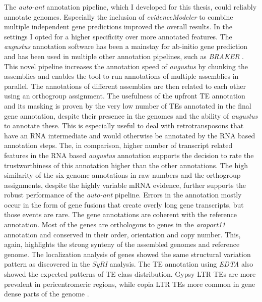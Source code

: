 The \textit{auto-ant} annotation pipeline, which I developed for this thesis, could reliably annotate genomes. Especially the inclusion of \textit{evidenceModeler} to combine multiple independent gene predictions improved the overall results. In the settings I opted for a higher specificity over more annotated features. The \textit{augustus} annotation software has been a mainstay for ab-initio gene prediction and has been used in multiple other annotation pipelines, such as \textit{BRAKER} \citep{Hoff2019-zi}. This novel pipeline increases the annotation speed of \textit{augustus} by chunking the assemblies and enables the tool to run annotations of multiple assemblies in parallel. The annotations of different assemblies are then related to each other using an orthogroup assignment. The usefulness of the upfront TE annotation and its masking is proven by the very low number of TEs annotated in the final gene annotation, despite their presence in the genomes and the ability of \textit{augustus} to annotate these. This is especially useful to deal with retrotransposons that have an RNA intermediate \citep{Wicker2007-nv} and would otherwise be annotated by the RNA based annotation steps. The, in comparison, higher number of transcript related features in the RNA based \textit{augustus} annotation supports the decision to rate the trustworthiness of this annotation higher than the other annotations. The high similarity of the six genome annotations in raw numbers and the orthogroup assignments, despite the highly variable mRNA evidence, further supports the robust performance of the \textit{auto-ant} pipeline. Errors in the annotation mostly occur in the form of gene fusions that create overly long gene transcripts, but those events are rare. The gene annotations are coherent with the reference annotation. Most of the genes are orthologous to genes in the \textit{araport11} annotation and conserved in their order, orientation and copy number. This, again, highlights the strong synteny of the assembled genomes and reference genome. The localization analysis of genes showed the same structural variation pattern as discovered in the \textit{SyRI} analysis. The TE annotation using \textit{EDTA} also showed the expected patterns of TE class distribution. Gypsy LTR TEs are more prevalent in pericentromeric regions, while copia LTR TEs more common in gene dense parts of the genome \citep{Hufford2021-ed}. \newline
